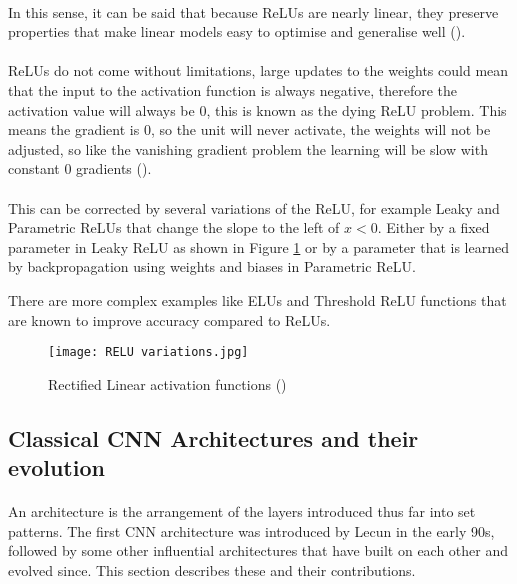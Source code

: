 \paragraph{}
In this sense, it can be said that because \gls{ReLU}s are nearly linear, they preserve properties that make linear models easy to optimise and generalise well (\cite{GoodBengCour16}).

\paragraph{}
\gls{ReLU}s do not come without limitations, large updates to the weights could mean that the input to the activation function is always negative, therefore the activation value will always be $0$, this is known as the dying \gls{ReLU} problem.
This means the gradient is $0$, so the unit will never activate, the weights will not be adjusted, so like the vanishing gradient problem the learning will be slow with constant 0 gradients (\cite{Maas13rectifiernonlinearities}).
\paragraph{}
This can be corrected by several variations of the \gls{ReLU}, for example Leaky and Parametric \gls{ReLU}s  that change the slope to the left of $x < 0$. Either by a fixed parameter in Leaky \gls{ReLU} as shown in Figure \ref{fig_relu} or by a parameter that is learned by backpropagation using weights and biases in Parametric \gls{ReLU}. 

There are more complex examples like \gls{ELU}s  and Threshold \gls{ReLU} functions that are known to improve accuracy compared to \gls{ReLU}s.

\begin{figure}[hbt!]
        \centering
        \texttt{[image: RELU variations.jpg]}
        \caption{Rectified Linear activation functions (\cite{leakyreluimg})}
        \label{fig_relu}
\end{figure}


\subsection{Classical \gls{CNN} Architectures and their evolution} \label{classic_cnn}
\paragraph{}
An architecture is the arrangement of the layers introduced thus far into set patterns. The first \gls{CNN} architecture was introduced by Lecun in the early 90s, followed by some other influential architectures that have built on each other and evolved since. This section describes these and their contributions.

